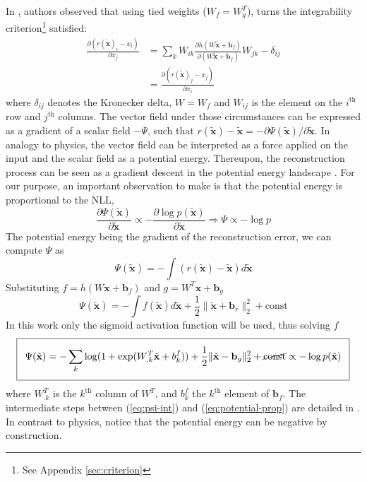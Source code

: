In \citep{potentialenergy}, authors observed that using tied weights ($W_f = W_g^T$), turns the integrability criterion\footnote{See Appendix \ref{sec:criterion}} satisfied:
\begin{equation}
\begin{split}
\frac{\partial(r(\tilde{\mathbf{x}})_i- x_i)}{\partial x_j} &=  \sum_k W_{ik} \frac{\partial h(W\tilde{\mathbf{x}} + \mathbf{b}_f)}{\partial(W\tilde{\mathbf{x}} + \mathbf{b}_f)}W_{jk} - \delta_{ij}   \\
&= \frac{\partial(r(\tilde{\mathbf{x}})_j- x_j)}{\partial x_i}
\end{split}
\end{equation} 
where $\delta_{ij}$ denotes the Kronecker delta, $W=W_f$ and $W_{ij}$ is the element on the $i^{\text{th}}$ row and $j^{\text{th}}$ columns. The vector field under those circumstances can be expressed as a gradient of a scalar field $-\Psi$, such that $r(\tilde{\mathbf{x}}) - \tilde{\mathbf{x}} = -\partial \Psi(\tilde{\mathbf{x}})/\partial \tilde{\mathbf{x}}$. In analogy to physics, the vector field can be interpreted as a force applied on the input and the scalar field as a potential energy. Thereupon, the reconstruction process can be seen as a gradient descent in the potential energy landscape \citep{potentialenergy}. For our purpose, an important observation to make is that the potential energy is proportional to the NLL,
\begin{equation}
\frac{\partial \Psi(\tilde{\mathbf{x}})}{\partial \tilde{\mathbf{x}}} \propto -\frac{\partial \log p(\tilde{\mathbf{x}})}{\partial \tilde{\mathbf{x}}} \Rightarrow  \Psi \propto -\log p
\end{equation}
The potential energy being the gradient of the reconstruction error, we can compute $\Psi$ as
\begin{equation}
 \Psi(\tilde{\mathbf{x}}) = -\int (r(\tilde{\mathbf{x}}) - \tilde{\mathbf{x}})d\tilde{\mathbf{x}} 
 \label{eq:psi-int}
\end{equation}
Substituting $f = h(W\mathbf{x} + \mathbf{b}_f)$ and $g = W^T\mathbf{x} + \mathbf{b}_g$
\begin{equation}
\Psi(\tilde{\mathbf{x}})= -\int f(\tilde{\mathbf{x}})d\tilde{\mathbf{x}} + \frac{1}{2} \lVert \tilde{\mathbf{x}} + \textbf{b}_r \rVert_2^2 + \text{const}
\end{equation} 
In this work only the sigmoid activation function will be used, thus solving $f$
\newcommand\boxedB[1]{{\setlength\fboxsep{8pt}\boxed{#1}}}
\begin{equation}
\boxedB{\Psi(\tilde{\mathbf{x}}) =  -\sum_k \log(1 + \text{exp}(W_{.k}^T \tilde{\mathbf{x}} + b_k^f)) + \frac{1}{2} \lVert \tilde{\mathbf{x}} - \textbf{b}_g \rVert_2^2 + \cancel{\text{const}} \propto -\log p(\tilde{\mathbf{x}})}
\label{eq:potential-prop}
\end{equation}
where $W_{.k}^T$ is the $k^{\text{th}}$ column of $W^T$, and $b_k^f$ the $k^{\text{th}}$ element of $\textbf{b}_f$. The intermediate steps between (\ref{eq:psi-int}) and (\ref{eq:potential-prop}) are detailed in \citep{potentialenergy}. In contrast to physics, notice that the potential energy can be negative by construction. 

